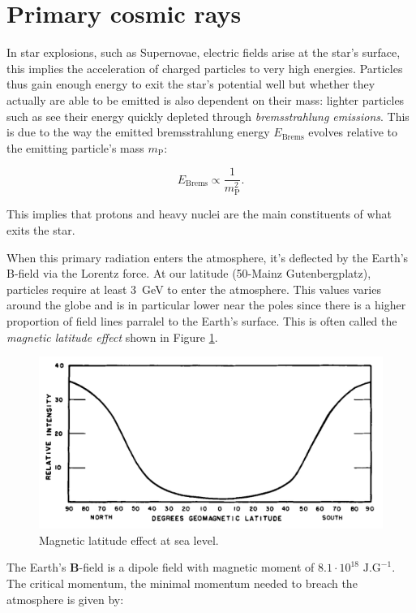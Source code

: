 \section{Primary cosmic rays}

In star explosions, such as Supernovae, electric fields arise at the star's surface, this implies the acceleration of charged particles to very high energies. Particles thus gain enough energy to exit the star's potential well but whether they actually are able to be emitted is also dependent on their mass: lighter particles such as \Pelectron see their energy quickly depleted through \textit{bremsstrahlung emissions}. This is due to the way the emitted bremsstrahlung energy $E_\text{Brems}$ evolves relative to the emitting particle's mass $m_\text{P}$:

\begin{equation}
E_\text{Brems}	\propto \frac{1}{m_\text{P}^2}.
\end{equation}

This implies that protons and heavy nuclei are the main constituents of what exits the star.

When this primary radiation enters the atmosphere, it's deflected by the Earth's B-field via the Lorentz force. At our latitude (50\degree -Mainz Gutenbergplatz), particles require at least \SI{3}{GeV} to enter the atmosphere. This values varies around the globe and is in particular lower near the poles since there is a higher proportion of field lines parralel to the Earth's surface. This is often called the \textit{magnetic latitude effect} shown in Figure \ref{fig:magintensity}.


\begin{figure}[htbp]
\centering
\includegraphics[width=0.8\linewidth]{./fig/intensity.png}
\caption{Magnetic latitude effect at sea level.}
\label{fig:magintensity}
\end{figure}

The Earth's $\mathbf{B}$-field is a dipole field with magnetic moment of $8.1 \cdot 10^{18}\text{ J}.\text{G}^{-1}$. The critical momentum, the minimal momentum needed to breach the atmosphere is given by:

